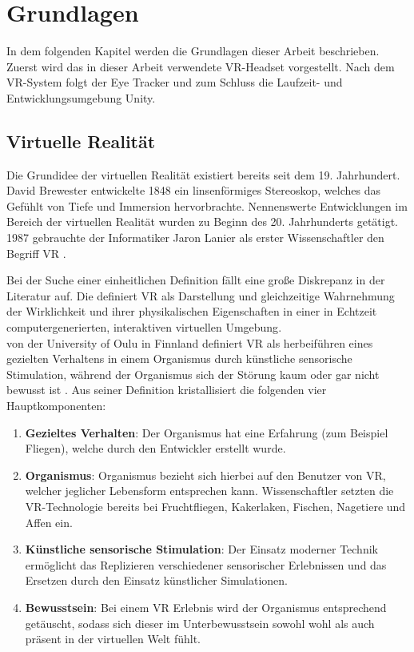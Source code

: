 
\chapter{Grundlagen}
In dem folgenden Kapitel werden die Grundlagen dieser Arbeit beschrieben. Zuerst wird das in dieser Arbeit verwendete \acs{VR}-Headset vorgestellt. Nach dem \acs{VR}-System folgt der Eye Tracker und zum Schluss die Laufzeit- und Entwicklungsumgebung Unity.

\section{Virtuelle Realität}
Die Grundidee der virtuellen Realität existiert bereits seit dem 19. Jahrhundert. David Brewester entwickelte 1848 ein linsenförmiges Stereoskop, welches das Gefühlt von Tiefe und Immersion hervorbrachte. Nennenswerte Entwicklungen im Bereich der virtuellen Realität wurden zu Beginn des 20. Jahrhunderts getätigt. \cite{Singh.2017} 1987 gebrauchte der Informatiker Jaron Lanier als erster Wissenschaftler den Begriff \ac{VR} \cite{Doerner2019}. 

Bei der Suche einer einheitlichen Definition fällt eine große Diskrepanz in der Literatur auf. Die \citeauthor{BundeszentralefurpolitischeBildung.2018} definiert \ac{VR} als \glqq Darstellung und gleichzeitige Wahrnehmung der Wirklichkeit und ihrer physikalischen Eigenschaften in einer in Echtzeit computergenerierten, interaktiven virtuellen Umgebung\grqq  \cite{BundeszentralefurpolitischeBildung.2018}. \\
\citeauthor{LaValle.2019} von der University of Oulu in Finnland definiert \ac{VR} als herbeiführen eines gezielten Verhaltens in einem Organismus durch künstliche sensorische Stimulation, während der Organismus sich der Störung kaum oder gar nicht bewusst ist \cite{LaValle.2019}. Aus seiner Definition kristallisiert \citeauthor{LaValle.2019} die folgenden vier Hauptkomponenten:\cite{LaValle.2019}
\begin{enumerate}
	\item \textbf{Gezieltes Verhalten}: Der Organismus hat eine Erfahrung (zum Beispiel Fliegen), welche durch den Entwickler erstellt wurde. 
	\item \textbf{Organismus}: Organismus bezieht sich hierbei auf den Benutzer von \ac{VR}, welcher jeglicher Lebensform entsprechen kann. Wissenschaftler setzten die \ac{VR}-Technologie bereits bei Fruchtfliegen, Kakerlaken, Fischen, Nagetiere und Affen ein. 
	\item \textbf{Künstliche sensorische Stimulation}: Der Einsatz moderner Technik ermöglicht das Replizieren verschiedener sensorischer Erlebnissen und das Ersetzen durch den Einsatz künstlicher Simulationen. 
	\item \textbf{Bewusstsein}: Bei einem \acl{VR} Erlebnis wird der Organismus entsprechend getäuscht, sodass sich dieser im Unterbewusstsein sowohl wohl als auch präsent in der virtuellen Welt fühlt.
\end{enumerate}

